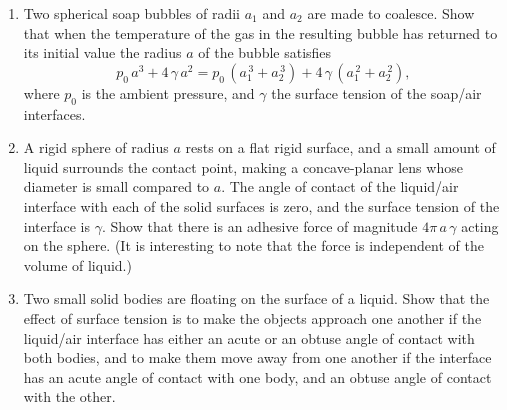 {\begin{enumerate}
\item Two spherical soap bubbles of radii $a_1$ and $a_2$ are made to coalesce. Show that when the
temperature of the gas in the resulting bubble has returned to its initial value the radius $a$ of
the bubble satisfies
$$
p_0\,a^3+ 4\,\gamma\,a^2= p_0\,(a_1^{\,3}+a_2^{\,3})+4\,\gamma\,(a_1^{\,2}+a_2^{\,2}),
$$
where $p_0$ is the ambient pressure, and $\gamma$ the surface tension of the soap/air interfaces. 

\item A rigid sphere of radius $a$ rests on a flat rigid surface, and a small amount of liquid surrounds
the contact point, making a concave-planar lens whose diameter is small compared to $a$. The
angle of contact of the liquid/air interface with each of the solid surfaces is zero, and the surface tension of the interface is $\gamma$. Show that there is an adhesive force of magnitude $4\pi\,a\,\gamma$ acting
on the sphere. (It is interesting to note that the force is independent of the volume of  liquid.)

\item Two small solid bodies are floating on the surface of a liquid. Show that the effect of
surface tension is to make the objects approach one another if the liquid/air interface has either an acute or an obtuse angle
of contact with both bodies, and to make them move away from one another if the interface has an acute
angle of contact with one body, and an obtuse angle of contact with the other.
\end{enumerate}}
